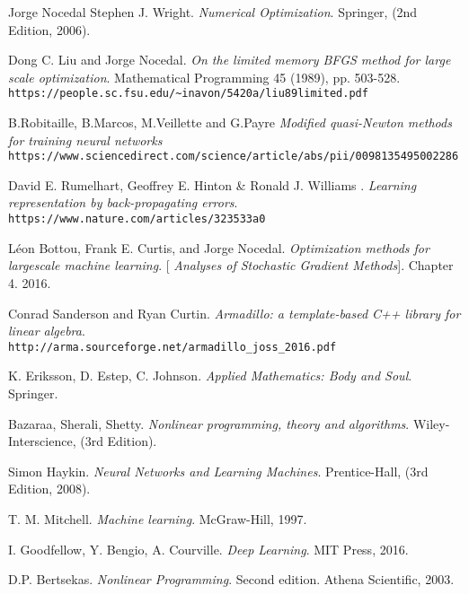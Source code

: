 \begin{thebibliography}{9}

	Jorge Nocedal  Stephen J. Wright.
	\textit{Numerical Optimization}. Springer, (2nd Edition, 2006).

	Dong C. Liu and Jorge Nocedal.
	\textit{On the limited memory BFGS method for large scale optimization}. Mathematical Programming 45 (1989), pp. 503-528.
	\\\texttt{https://people.sc.fsu.edu/\textasciitilde inavon/5420a/liu89limited.pdf}
	
	B.Robitaille, B.Marcos, M.Veillette and G.Payre
	\textit{Modified quasi-Newton methods for training neural networks} 
	\\\texttt{https://www.sciencedirect.com/science/article/abs/pii/0098135495002286}
	
	David E. Rumelhart, Geoffrey E. Hinton \& Ronald J. Williams . 
	\textit{Learning representation by back-propagating errors}. 
	\\\texttt{https://www.nature.com/articles/323533a0}
	
		
	Léon Bottou, Frank E. Curtis, and Jorge Nocedal.
	\textit{Optimization methods for largescale machine learning}. 
	[\textit{ Analyses of Stochastic Gradient Methods}]. Chapter 4.
	2016.
	
	Conrad Sanderson and Ryan Curtin. 
	\textit{Armadillo: a template-based C++ library for linear algebra}. 
	\\\texttt{http://arma.sourceforge.net/armadillo\_joss\_2016.pdf}

	K. Eriksson, D. Estep, C. Johnson. 
	\textit{Applied Mathematics: Body and Soul}. 
	Springer.
	
	Bazaraa, Sherali, Shetty. 
	\textit{Nonlinear programming, theory and algorithms}. 
	Wiley-Interscience, (3rd Edition).
	
	Simon Haykin. 
	\textit{Neural Networks and Learning Machines}. 
	Prentice-Hall, (3rd Edition, 2008).


	T. M. Mitchell. 
	\textit{Machine learning}. 
	McGraw-Hill, 1997.
	
	I. Goodfellow, Y. Bengio, A. Courville. 
	\textit{Deep Learning}. 
	MIT Press,  2016.
	
	D.P. Bertsekas.
	\textit{Nonlinear Programming}. 
	Second edition. Athena Scientific, 2003.
	

\end{thebibliography}
